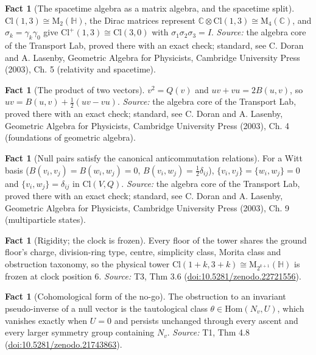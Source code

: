 \documentclass[11pt]{article}
\theoremstyle{definition}
\newtheorem{fact}[theorem]{Fact}
\theoremstyle{plain}
\providecommand{\C}{}\renewcommand{\C}{\mathbb{C}}
\providecommand{\Cl}{}\renewcommand{\Cl}{\mathrm{Cl}}
\providecommand{\HH}{}\renewcommand{\HH}{\mathbb{H}}
\providecommand{\Mat}{}\renewcommand{\Mat}{\mathrm{M}}
\begin{document}
\begin{fact}[The spacetime algebra as a matrix algebra, and the spacetime split]\label{c:std-algebra.sta-matrix}
$\Cl(1,3) \cong \Mat_2(\HH)$, the Dirac matrices represent $\C \otimes \Cl(1,3) \cong \Mat_4(\C)$, and $\sigma_k = \gamma_k\gamma_0$ give $\Cl^{+}(1,3) \cong \Cl(3,0)$ with $\sigma_1\sigma_2\sigma_3 = I$.
\emph{Source:} the algebra core of the Transport Lab, proved there with an exact check; standard, see C. Doran and A. Lasenby, Geometric Algebra for Physicists, Cambridge University Press (2003), Ch. 5 (relativity and spacetime).
\end{fact}

\begin{fact}[The product of two vectors]\label{c:std-algebra.vector-squares}
$v^{2} = Q(v)$ and $uv + vu = 2B(u, v)$, so $uv = B(u, v) + \tfrac12(uv - vu)$.
\emph{Source:} the algebra core of the Transport Lab, proved there with an exact check; standard, see C. Doran and A. Lasenby, Geometric Algebra for Physicists, Cambridge University Press (2003), Ch. 4 (foundations of geometric algebra).
\end{fact}

\begin{fact}[Null pairs satisfy the canonical anticommutation relations]\label{c:std-algebra.witt-basis-car}
For a Witt basis ($B(v_i,v_j) = B(w_i,w_j) = 0$, $B(v_i,w_j) = \tfrac12\delta_{ij}$), $\{v_i,v_j\} = \{w_i,w_j\} = 0$ and $\{v_i,w_j\} = \delta_{ij}$ in $\Cl(V,Q)$.
\emph{Source:} the algebra core of the Transport Lab, proved there with an exact check; standard, see C. Doran and A. Lasenby, Geometric Algebra for Physicists, Cambridge University Press (2003), Ch. 9 (multiparticle states).
\end{fact}

\begin{fact}[Rigidity; the clock is frozen]\label{c:tower.rigidity-clock-frozen}
Every floor of the tower shares the ground floor's charge, division-ring type, centre, simplicity class, Morita class and obstruction taxonomy, so the physical tower $\Cl(1{+}k, 3{+}k) \cong \Mat_{2^{k+1}}(\HH)$ is frozen at clock position $6$.
\emph{Source:} T3, Thm 3.6 (\href{https://doi.org/10.5281/zenodo.22721556}{doi:10.5281/zenodo.22721556}).
\end{fact}

\begin{fact}[Cohomological form of the no-go]\label{c:transport.cohomological-form-no-go}
The obstruction to an invariant pseudo-inverse of a null vector is the tautological class $\theta \in \mathrm{Hom}(N_v, U)$, which vanishes exactly when $U = 0$ and persists unchanged through every ascent and every larger symmetry group containing $N_v$.
\emph{Source:} T1, Thm 4.8 (\href{https://doi.org/10.5281/zenodo.21743863}{doi:10.5281/zenodo.21743863}).
\end{fact}
\end{document}
